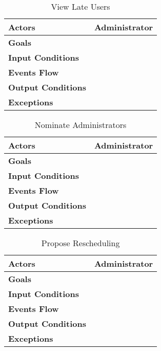 \begin{table}[H]
	\centering
	\def\arraystretch{1.5}
	\begin{tabular}{|p{7cm}|p{7cm}|}
		\hline
		\textbf{Actors}            & Administrator    \\ \hline
		\textbf{Goals}             &            \\ \hline
		\textbf{Input Conditions}  &            \\ \hline
		\textbf{Events Flow}       &            \\ \hline
		\textbf{Output Conditions} &            \\ \hline
		\textbf{Exceptions}        &            \\ \hline
	\end{tabular}
	\caption{View Late Users}
\end{table}

\begin{table}[H]
	\centering
	\def\arraystretch{1.5}
	\begin{tabular}{|p{7cm}|p{7cm}|}
		\hline
		\textbf{Actors}            & Administrator    \\ \hline
		\textbf{Goals}             &            \\ \hline
		\textbf{Input Conditions}  &            \\ \hline
		\textbf{Events Flow}       &            \\ \hline
		\textbf{Output Conditions} &            \\ \hline
		\textbf{Exceptions}        &            \\ \hline
	\end{tabular}
	\caption{Nominate Administrators}
\end{table}

\begin{table}[H]
	\centering
	\def\arraystretch{1.5}
	\begin{tabular}{|p{7cm}|p{7cm}|}
		\hline
		\textbf{Actors}            & Administrator    \\ \hline
		\textbf{Goals}             &            \\ \hline
		\textbf{Input Conditions}  &            \\ \hline
		\textbf{Events Flow}       &            \\ \hline
		\textbf{Output Conditions} &            \\ \hline
		\textbf{Exceptions}        &            \\ \hline
	\end{tabular}
	\caption{Propose Rescheduling}
\end{table}